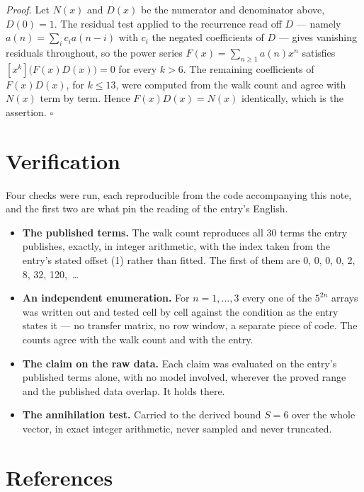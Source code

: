 \documentclass[11pt]{article}
\theoremstyle{definition}
\begin{document}
{\itshape Proof.} Let $N(x)$ and $D(x)$ be the numerator and denominator above, $D(0)=1$. The residual test applied to the recurrence read off $D$ --- namely $a(n) = \sum_i c_i a(n-i)$ with $c_i$ the negated coefficients of $D$ --- gives vanishing residuals throughout, so the power series $F(x)=\sum_{n\ge 1}a(n)x^n$ satisfies $[x^k]\bigl(F(x)D(x)\bigr) = 0$ for every $k > 6$. The remaining coefficients of $F(x)D(x)$, for $k \le 13$, were computed from the walk count and agree with $N(x)$ term by term. Hence $F(x)D(x) = N(x)$ identically, which is the assertion. $\square$

\section{Verification}

Four checks were run, each reproducible from the code accompanying this note, and the first two are what pin the reading of the entry's English.

\begin{itemize}

\item {\bfseries The published terms.} The walk count reproduces all 30 terms the entry publishes, exactly, in integer arithmetic, with the index taken from the entry's stated offset (1) rather than fitted. The first of them are 0, 0, 0, 0, 2, 8, 32, 120,~\dots

\item {\bfseries An independent enumeration.} For $n = 1,\dots,3$ every one of the $5^{2n}$ arrays was written out and tested cell by cell against the condition as the entry states it --- no transfer matrix, no row window, a separate piece of code. The counts agree with the walk count and with the entry.

\item {\bfseries The claim on the raw data.} Each claim was evaluated on the entry's published terms alone, with no model involved, wherever the proved range and the published data overlap. It holds there.

\item {\bfseries The annihilation test.} Carried to the derived bound $S = 6$ over the whole vector, in exact integer arithmetic, never sampled and never truncated.

\end{itemize}

\section{References}
\end{document}
